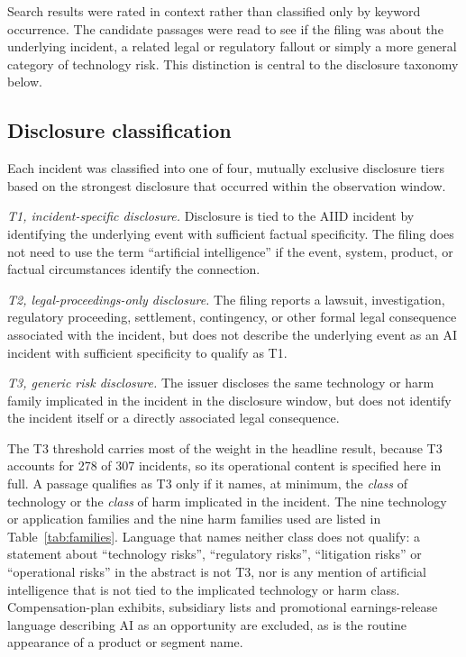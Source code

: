 \documentclass[utf8]{FrontiersinHarvard}
\begin{document}
Search results were rated in context rather than classified only by keyword occurrence. The candidate passages were read to see if the filing was about the underlying incident, a related legal or regulatory fallout or simply a more general category of technology risk. This distinction is central to the disclosure taxonomy below.

\subsection{Disclosure classification}
Each incident was classified into one of four, mutually exclusive disclosure tiers based on the strongest disclosure that occurred within the observation window.

\textit{T1, incident-specific disclosure.} Disclosure is tied to the AIID incident by identifying the underlying event with sufficient factual specificity. The filing does not need to use the term ``artificial intelligence'' if the event, system, product, or factual circumstances identify the connection.

\textit{T2, legal-proceedings-only disclosure.} The filing reports a lawsuit, investigation, regulatory proceeding, settlement, contingency, or other formal legal consequence associated with the incident, but does not describe the underlying event as an AI incident with sufficient specificity to qualify as T1.

\textit{T3, generic risk disclosure.} The issuer discloses the same technology or harm family implicated in the incident in the disclosure window, but does not identify the incident itself or a directly associated legal consequence.

The T3 threshold carries most of the weight in the headline result, because T3 accounts for 278 of 307 incidents, so its operational content is specified here in full. A passage qualifies as T3 only if it names, at minimum, the \emph{class} of technology or the \emph{class} of harm implicated in the incident. The nine technology or application families and the nine harm families used are listed in Table~\ref{tab:families}.
 Language that names neither class does not qualify: a statement about ``technology risks'', ``regulatory risks'', ``litigation risks'' or ``operational risks'' in the abstract is not T3, nor is any mention of artificial intelligence that is not tied to the implicated technology or harm class. Compensation-plan exhibits, subsidiary lists and promotional earnings-release language describing AI as an opportunity are excluded, as is the routine appearance of a product or segment name.
\end{document}

